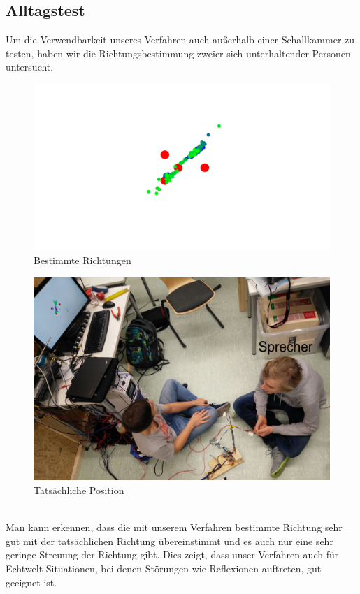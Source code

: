 \subsection{Alltagstest}
Um die Verwendbarkeit unseres Verfahren auch außerhalb einer Schallkammer zu testen, haben wir die Richtungsbestimmung zweier sich unterhaltender Personen untersucht.\\
\begin{minipage}{0.49\linewidth}
  \begin{figure}[H]
    \centering
    \includegraphics[width=\textwidth]{img/real_real_data}
    \caption{Bestimmte Richtungen}
    \label{fig:real_real_data}
  \end{figure}
\end{minipage}\hfill
{}
\begin{minipage}{0.49\linewidth}
  \begin{figure}[H]
    \centering
    \includegraphics[width=\textwidth]{img/real_real}
    \caption{Tatsächliche Position}
    \label{fig:real_real}
  \end{figure}
\end{minipage}
\vspace{10pt}
\\
Man kann erkennen, dass die mit unserem Verfahren bestimmte Richtung sehr gut mit der tatsächlichen Richtung übereinstimmt und es auch nur eine sehr geringe Streuung der Richtung gibt. Dies zeigt, dass unser Verfahren auch für Echtwelt Situationen, bei denen Störungen wie Reflexionen auftreten, gut geeignet ist.
\newpage
